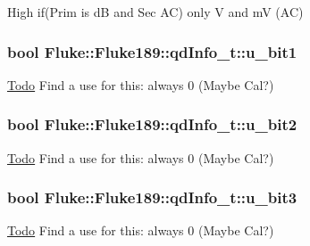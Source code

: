 \label{structFluke_1_1Fluke189_1_1qdInfo__t_aec06148ae228f11298bf487bcabc630c}
High if(Prim is dB and Sec AC) only V and mV (AC) \hypertarget{structFluke_1_1Fluke189_1_1qdInfo__t_a49bb210666c03813d3e2dd5e7739c97f}{
\subsubsection[{u\_\-bit1}]{\setlength{\rightskip}{0pt plus 5cm}bool {\bf Fluke::Fluke189::qdInfo\_\-t::u\_\-bit1}}}
\label{structFluke_1_1Fluke189_1_1qdInfo__t_a49bb210666c03813d3e2dd5e7739c97f}
\begin{Desc}
\item[\hyperlink{todo__todo000009}{Todo}]Find a use for this: always 0 (Maybe Cal?) \end{Desc}
\hypertarget{structFluke_1_1Fluke189_1_1qdInfo__t_a3ee66a3c3b07169f2470fc7b8d832601}{
\subsubsection[{u\_\-bit2}]{\setlength{\rightskip}{0pt plus 5cm}bool {\bf Fluke::Fluke189::qdInfo\_\-t::u\_\-bit2}}}
\label{structFluke_1_1Fluke189_1_1qdInfo__t_a3ee66a3c3b07169f2470fc7b8d832601}
\begin{Desc}
\item[\hyperlink{todo__todo000010}{Todo}]Find a use for this: always 0 (Maybe Cal?) \end{Desc}
\hypertarget{structFluke_1_1Fluke189_1_1qdInfo__t_a1989b018d05ed21b310846a8cba4099e}{
\subsubsection[{u\_\-bit3}]{\setlength{\rightskip}{0pt plus 5cm}bool {\bf Fluke::Fluke189::qdInfo\_\-t::u\_\-bit3}}}
\label{structFluke_1_1Fluke189_1_1qdInfo__t_a1989b018d05ed21b310846a8cba4099e}
\begin{Desc}
\item[\hyperlink{todo__todo000011}{Todo}]Find a use for this: always 0 (Maybe Cal?) \end{Desc}
